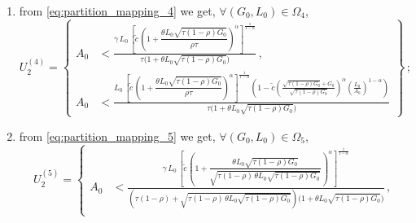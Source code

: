 \documentclass[a4paper,fleqn]{cas-sc}
\begin{document}
\begin{enumerate}
\begin{equation}
        U_2^{(3)} = \left\{ 
        \begin{aligned}
            A_0 &< \frac{\gamma\,L_0\,\left[\tilde{c}\,\left(1+\sqrt{\dfrac{\rho\hat{L}}{1-\rho}}\right)^{\alpha}\right]^{\frac{1}{1-\alpha}}}{\tau\Big(1-\rho+\sqrt{(1-\rho)\rho\,\hat{L}}\Big)\big(1+\tau\rho\,\hat{L}\big)}\,,\\[10pt]
            A_0 &< \frac{L_0\,\left[\tilde{c}\,\left(1+\sqrt{\dfrac{\rho\hat{L}}{1-\rho}}\right)^{\alpha}\right]^{\frac{1}{1-\alpha}}\left(1-\tilde{c}\left(\frac{\rho\tau+G_0}{\rho\tau}\right)^{\alpha}\left(\frac{L_0}{A_0}\right)^{1-\alpha}\right)}{\tau\Big(1-\rho+\sqrt{(1-\rho)\rho\,\hat{L}}\Big)\big(1+\tau\rho\,\hat{L}\big)}
        \end{aligned}
        \right\}\,;
    \end{equation}
    \item from \eqref{eq:partition_mapping_4} we get, $\forall (G_0,L_0)\in\Omega_4$,
    \begin{equation}\label{eq:subset_M2_4}
        U_2^{(4)} = \left\{ 
        \begin{aligned}
            A_0 &< \frac{\gamma\,L_0\,\left[\tilde{c}\,\left(1+\dfrac{\theta L_0\sqrt{\tau(1-\rho)G_0}}{\rho\tau}\right)^{\alpha}\right]^{\frac{1}{1-\alpha}}}{\tau\Big(1+\theta L_0\sqrt{\tau(1-\rho)G_0}\Big)}\,,\\[10pt]
            A_0 &< \frac{L_0\,\left[\tilde{c}\,\left(1+\dfrac{\theta L_0\sqrt{\tau(1-\rho)G_0}}{\rho\tau}\right)^{\alpha}\right]^{\frac{1}{1-\alpha}}\left(1-\tilde{c}\left(\frac{\sqrt{\tau(1-\rho)G_0}+G_0}{\sqrt{\tau(1-\rho)G_0}}\right)^{\alpha}\left(\frac{L_0}{A_0}\right)^{1-\alpha}\right)}{\tau\Big(1+\theta L_0\sqrt{\tau(1-\rho)G_0}\Big)}
        \end{aligned}
        \right\}\,;
    \end{equation}
    \item from \eqref{eq:partition_mapping_5} we get, $\forall (G_0,L_0)\in\Omega_5$,
    \begin{equation}\label{eq:subset_M2_5}
        U_2^{(5)} = \left\{ 
        \begin{aligned}
            A_0 &< \frac{\gamma\,L_0\,\left[\tilde{c}\,\left(1+\dfrac{\theta L_0\sqrt{\tau(1-\rho)G_0}}{\sqrt{\tau(1-\rho)\,\theta L_0\sqrt{\tau(1-\rho)G_0}}}\right)^{\alpha}\right]^{\frac{1}{1-\alpha}}}{\left(\tau(1-\rho)+\sqrt{\tau(1-\rho)\,\theta L_0\sqrt{\tau(1-\rho)G_0}}\right)\Big(1+\theta L_0\sqrt{\tau(1-\rho)G_0}\Big)}\,,\\[10pt]

\end{aligned}
\end{equation}
\end{enumerate}
\end{document}
